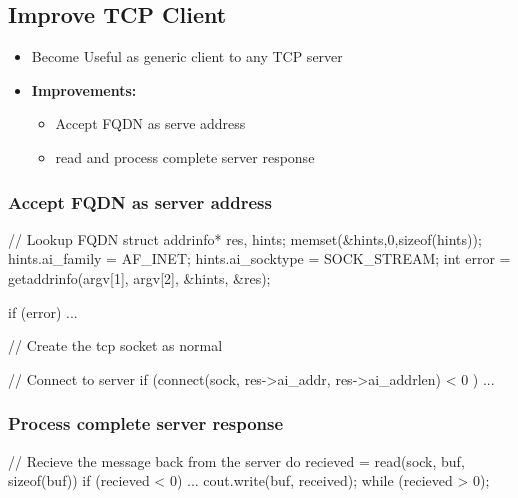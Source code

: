 \documentclass{report}
\begin{document}
    \pagebreak 
    \bigbreak \noindent 
    \subsection{Improve TCP Client}
    \bigbreak \noindent 
    \begin{itemize}
        \item Become Useful as generic client to any TCP server
        \item \textbf{Improvements:}
            \begin{itemize}
                \item Accept FQDN as serve address
                \item read and process complete server response
            \end{itemize}
    \end{itemize}
    \bigbreak \noindent 
    \subsubsection{Accept FQDN as server address}
    \bigbreak \noindent 
    \begin{cppcode}
    // Lookup FQDN
    struct addrinfo* res, hints;
    memset(&hints,0,sizeof(hints));
    hints.ai_family = AF_INET;
    hints.ai_socktype = SOCK_STREAM;
    int error = getaddrinfo(argv[1], argv[2], &hints, &res);

    if (error) { ... }

    // Create the tcp socket as normal

    // Connect to server
    if (connect(sock, res->ai_addr, res->ai_addrlen) < 0 ) { ... }
    \end{cppcode}

    \bigbreak \noindent 
    \subsubsection{Process complete server response}
    \bigbreak \noindent 
    \begin{cppcode}
        // Recieve the message back from the server
        do {
            recieved = read(sock, buf, sizeof(buf))
            if (recieved < 0) { ... }
            cout.write(buf, received);
        } while (recieved > 0);
    \end{cppcode}

    \pagebreak 
\end{document}

